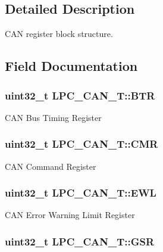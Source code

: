\subsection{Detailed Description}
C\-A\-N register block structure. 

\subsection{Field Documentation}
\hypertarget{structLPC__CAN__T_a2ef6231da82a2f3f55f05797f8ac4fa0}{
\subsubsection[{B\-T\-R}]{ uint32\-\_\-t L\-P\-C\-\_\-\-C\-A\-N\-\_\-\-T\-::\-B\-T\-R}}\label{structLPC__CAN__T_a2ef6231da82a2f3f55f05797f8ac4fa0}
C\-A\-N Bus Timing Register \hypertarget{structLPC__CAN__T_a2b22d55ceb4c934524714384f23cc87e}{
\subsubsection[{C\-M\-R}]{ uint32\-\_\-t L\-P\-C\-\_\-\-C\-A\-N\-\_\-\-T\-::\-C\-M\-R}}\label{structLPC__CAN__T_a2b22d55ceb4c934524714384f23cc87e}
C\-A\-N Command Register \hypertarget{structLPC__CAN__T_ab79cd2d466c6f59c3bb43873fd556af6}{
\subsubsection[{E\-W\-L}]{ uint32\-\_\-t L\-P\-C\-\_\-\-C\-A\-N\-\_\-\-T\-::\-E\-W\-L}}\label{structLPC__CAN__T_ab79cd2d466c6f59c3bb43873fd556af6}
C\-A\-N Error Warning Limit Register \hypertarget{structLPC__CAN__T_ae36d4c72254feab1bce53a7653612acc}{
\subsubsection[{G\-S\-R}]{ uint32\-\_\-t L\-P\-C\-\_\-\-C\-A\-N\-\_\-\-T\-::\-G\-S\-R}}\label{structLPC__CAN__T_ae36d4c72254feab1bce53a7653612acc}

